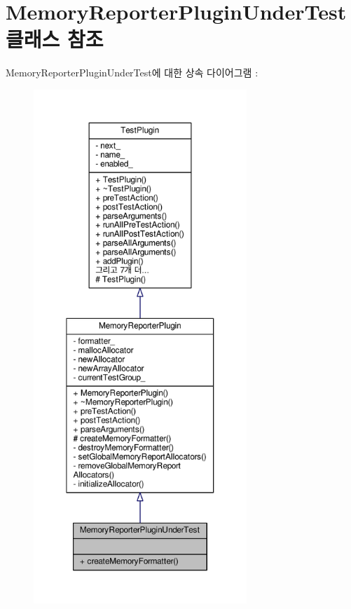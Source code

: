 \hypertarget{class_memory_reporter_plugin_under_test}{}\section{Memory\+Reporter\+Plugin\+Under\+Test 클래스 참조}
\label{class_memory_reporter_plugin_under_test}


Memory\+Reporter\+Plugin\+Under\+Test에 대한 상속 다이어그램 \+: 
\nopagebreak
\begin{figure}[H]
\begin{center}
\leavevmode
\includegraphics[height=550pt]{class_memory_reporter_plugin_under_test__inherit__graph}
\end{center}
\end{figure}


